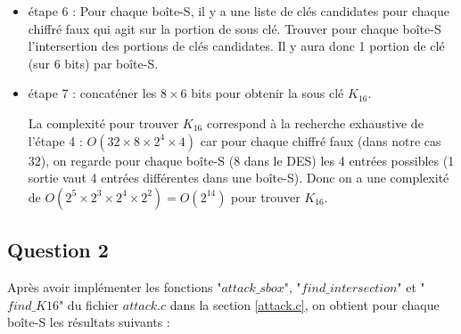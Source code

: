 \documentclass[11pt]{article}
\begin{document}
\begin{itemize}
	\item étape 6 : Pour chaque boîte-S, il y a une liste de clés candidates pour chaque chiffré faux qui agit sur la portion de sous clé. Trouver pour chaque boîte-S l'intersertion des portions de clés candidates. Il y aura donc 1 portion de clé (sur 6 bits) par boîte-S. \newline
	
	\item étape 7 : concaténer les $8 \times 6$ bits pour obtenir la sous clé $K_{16}$. \newline
	
	La complexité pour trouver $K_{16}$ correspond à la recherche exhaustive de l'étape 4 : \newline $O(32 \times 8 \times 2^4 \times 4)$ car pour chaque chiffré faux (dans notre cas $32$), on regarde pour chaque boîte-S ($8$ dans le DES) les 4 entrées possibles (1 sortie vaut 4 entrées différentes dans une boîte-S). \newline Donc on a une complexité de $O(2^5 \times 2^3 \times 2^4 \times 2^2)=O(2^{14})$ pour trouver $K_{16}$. 

\end{itemize}

\subsection{Question 2}

Après avoir implémenter les fonctions "$attack\_sbox$", "$find\_intersection$" et "$find\_K16$" du fichier $attack.c$ dans la section \ref{attack.c}, on obtient pour chaque boîte-S les résultats suivants : 
\end{document}
